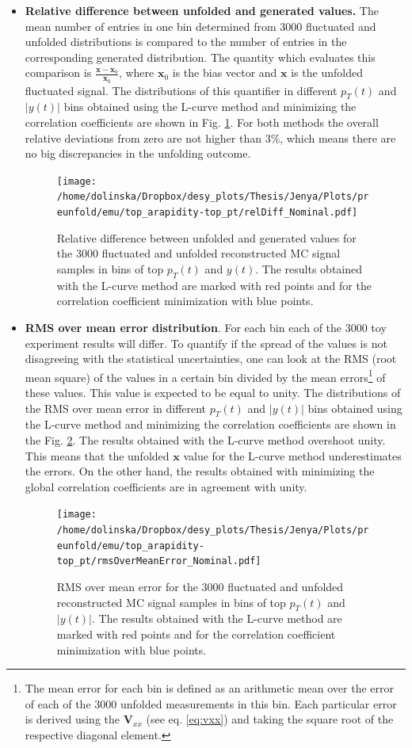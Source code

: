 \begin{itemize}
 \item \textbf{Relative difference between unfolded and generated values.} The mean number of entries in one bin determined from 3000 fluctuated and unfolded distributions
 is  compared to the number of entries in the corresponding generated distribution. The quantity which evaluates this comparison is
 $\frac{\mathbf{x} - \mathbf{x}_{0}}{\mathbf{x}_{0}}$, where $\mathbf{x}_{0}$ is the bias vector and $\mathbf{x}$ is the unfolded fluctuated signal. 
 The distributions of this quantifier in different $p_{T}(t)$ and $|y(t)|$ bins obtained using the L-curve method and minimizing the correlation coefficients 
 are shown in Fig. \ref{fig:DiffovErr}. For both methods the overall relative deviations from zero are not
 higher than 3\%, which means there are no big discrepancies in the unfolding outcome.
 \begin{figure}[t]
 \centering
 \texttt{[image: /home/dolinska/Dropbox/desy\_plots/Thesis/Jenya/Plots/preunfold/emu/top\_arapidity-top\_pt/relDiff\_Nominal.pdf]}
 \caption{Relative difference between unfolded and generated values for the 3000 fluctuated and unfolded reconstructed MC signal samples in bins of 
         top $p_{T}(t)$ and $y(t)$. The results obtained with the L-curve method are marked with red points and for the correlation coefficient 
         minimization with blue points.}
 \label{fig:DiffovErr}
\end{figure}
 
 \item \textbf{RMS over mean error distribution}. For each bin  each of the 3000 toy experiment results will differ. To quantify if the spread of 
 the values is not disagreeing with the statistical uncertainties, one can look at the 
 RMS (root mean square) of the values in a certain bin divided by the mean errors\footnote{The mean error for each bin is defined as an arithmetic mean 
 over the error of each of the 3000 unfolded measurements in this bin. Each particular error is derived using the $\mathbf{V}_{xx}$ (see eq. \ref{eq:vxx})
 and taking the square root of the respective diagonal element.} of these values. This value is expected to be equal to unity. The distributions 
 of the RMS over mean error in different $p_{T}(t)$ and $|y(t)|$ bins obtained using the L-curve method and minimizing the correlation coefficients 
 are shown in the Fig. \ref{fig:RMSovMeanErr}. The results obtained with the L-curve method overshoot unity. This means that the unfolded $\mathbf{x}$ 
 value for the L-curve method underestimates the errors. On the other hand, the results obtained with minimizing the global correlation coefficients 
 are in agreement with unity.
 \begin{figure}[t]
  \centering
  \texttt{[image: /home/dolinska/Dropbox/desy\_plots/Thesis/Jenya/Plots/preunfold/emu/top\_arapidity-top\_pt/rmsOverMeanError\_Nominal.pdf]}
  \caption{RMS over mean error for the 3000 fluctuated and unfolded reconstructed MC signal samples in bins of top $p_{T}(t)$ and $|y(t)|$. The results obtained 
          with the L-curve method are marked with red points and for the correlation coefficient minimization with blue points.}
  \label{fig:RMSovMeanErr}
 \end{figure}


\end{itemize}
